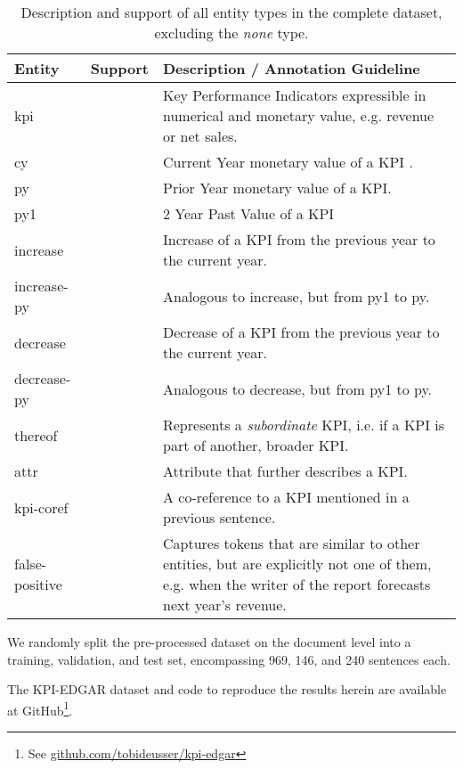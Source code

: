 \documentclass[conference, table]{IEEEtran}
\newcommand{\1} {\mathbbm{1}}
\begin{document}
\begin{table}[t]
\scriptsize
\renewcommand\tabularxcolumn[1]{m{#1}}
\begin{tabularx}{\linewidth}{l@{\hspace{1em}}r@{\hspace{1em}}X} \toprule
\rowcolor{white} Entity &  Support & Description / Annotation Guideline \\
\midrule
kpi             &  & Key Performance Indicators expressible in numerical and monetary value, e.g. revenue or net sales.\\
cy              &  & Current Year monetary value of a KPI
.
\\
py              &  & Prior Year monetary value of a KPI.\\
py1             &  & 2 Year Past Value of a KPI \\
increase        &  & Increase of a KPI from the previous year to the current year.\\
increase-py     &  & Analogous to increase, but from py1 to py.\\
decrease        &  & Decrease of a KPI from the previous year to the current year.\\
decrease-py     &  & Analogous to decrease, but from py1 to py.\\
thereof           &  & Represents a \textit{subordinate} KPI, i.e. if a KPI is part of another, broader KPI.\\
attr            &  & Attribute that further describes a KPI.\\
kpi-coref       &  & A co-reference to a KPI mentioned in a previous sentence.\\
false-positive  &  & Captures tokens that are similar to other entities, but are explicitly not one of them, e.g. when the writer of the report forecasts next year's revenue.\\
\bottomrule
\end{tabularx}


%
 \caption{Description and support of all entity types in the complete dataset, excluding the \textit{none} type.}
\label{tab:entities}
\end{table}



We randomly split the pre-processed dataset on the document
level into a training, validation, and test set, encompassing
969, 146, and 240 sentences each. 

The KPI-EDGAR dataset and code to reproduce the results herein are available at GitHub\footnote{See \href{https://github.com/tobideusser/kpi-edgar}{github.com/tobideusser/kpi-edgar}}.
\end{document}
